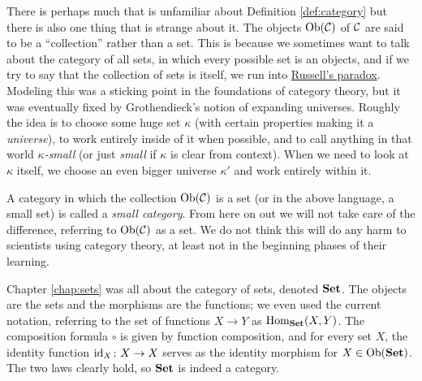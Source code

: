 \begin{remark}\label{rmk:small}

There is perhaps much that is unfamiliar about Definition \ref{def:category} but there is also one thing that is strange about it. The objects $\textnormal{Ob}(\mathcal{C})$ of $\mathcal{C}$ are said to be a “collection” rather than a set. This is because we sometimes want to talk about the category of all sets, in which every possible set is an objects, and if we try to say that the collection of sets is itself, we run into \href{http://en.wikipedia.org/wiki/Russell's_paradox}{\text Russell's paradox}. Modeling this was a sticking point in the foundations of category theory, but it was eventually fixed by Grothendieck's notion of expanding universes. Roughly the idea is to choose some huge set $\kappa$ (with certain properties making it a {\em universe}), to work entirely inside of it when possible, and to call anything in that world {\em $\kappa$-small} (or just {\em small} if $\kappa$ is clear from context). When we need to look at $\kappa$ itself, we  choose an even bigger universe $\kappa'$ and work entirely within it.

A category in which the collection $\textnormal{Ob}(\mathcal{C})$ is a set (or in the above language, a small set) is called a {\em small category}. From here on out we will not take care of the difference, referring to $\textnormal{Ob}(\mathcal{C})$ as a set. We do not think this will do any harm to scientists using category theory, at least not in the beginning phases of their learning.

\end{remark}

\begin{example}

Chapter \ref{chap:sets} was all about the category of sets, denoted ${\bf Set}$. The objects are the sets and the morphisms are the functions; we even used the current notation, referring to the set of functions $X\to Y$ as $\textnormal{Hom}_{\bf Set}(X,Y)$. The composition formula $\circ$ is given by function composition, and for every set $X$, the identity function $\textnormal{id}_X\colon X\rightarrow X$ serves as the identity morphism for $X\in\textnormal{Ob}({\bf Set})$. The two laws clearly hold, so ${\bf Set}$ is indeed a category. 

\end{example}

